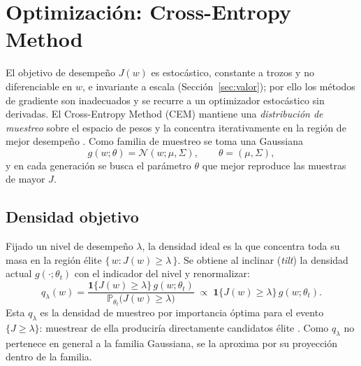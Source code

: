 \section{Optimización: Cross-Entropy Method}
\label{sec:cem}

El objetivo de desempeño $J(w)$ es estocástico, constante a trozos y no
diferenciable en $w$, e invariante a escala (Sección~\ref{sec:valor}); por ello los
métodos de gradiente son inadecuados y se recurre a un optimizador estocástico sin
derivadas. El Cross-Entropy Method (CEM) mantiene una \emph{distribución de muestreo}
sobre el espacio de pesos y la concentra iterativamente en la región de mejor
desempeño \citep{rubinstein1999, deboer2005}. Como familia de muestreo se toma una
Gaussiana
\begin{equation}
  g(w; \theta) = \mathcal{N}(w; \mu, \Sigma), \qquad \theta = (\mu, \Sigma),
  \label{eq:cem-familia}
\end{equation}
y en cada generación se busca el parámetro $\theta$ que mejor reproduce las muestras
de mayor $J$.

\subsection{Densidad objetivo}
Fijado un nivel de desempeño $\lambda$, la densidad ideal es la que concentra toda su
masa en la región élite $\{\, w : J(w) \ge \lambda \,\}$. Se obtiene al inclinar
(\emph{tilt}) la densidad actual $g(\cdot; \theta_{t})$ con el indicador del nivel y
renormalizar:
\begin{equation}
  q_{\lambda}(w)
  = \frac{\mathbf{1}\{J(w) \ge \lambda\}\, g(w; \theta_{t})}
         {\mathbb{P}_{\theta_{t}}\!\big(J(w) \ge \lambda\big)}
  \;\propto\; \mathbf{1}\{J(w) \ge \lambda\}\, g(w; \theta_{t}).
  \label{eq:cem-target}
\end{equation}
Esta $q_{\lambda}$ es la densidad de muestreo por importancia óptima para el evento
$\{J \ge \lambda\}$: muestrear de ella produciría directamente candidatos élite
\citep{rubinstein1999}. Como $q_{\lambda}$ no pertenece en general a la familia
Gaussiana, se la aproxima por su proyección dentro de la familia.

